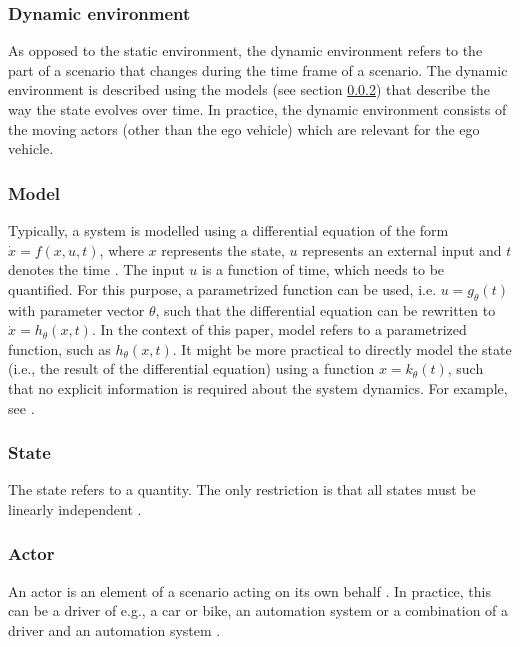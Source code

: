 \subsubsection{Dynamic environment}
\label{sec:dynamic environment}
As opposed to the static environment, the dynamic environment refers to the part of a scenario that changes during the time frame of a scenario. The dynamic environment is described using the models (see section \ref{sec:model}) that describe the way the state evolves over time. In practice, the dynamic environment consists of the moving actors (other than the ego vehicle) which are relevant for the ego vehicle.

\subsubsection{Model}
\label{sec:model}
Typically, a system is modelled using a differential equation of the form $\dot{x}=f(x,u,t)$, where $x$ represents the state, $u$ represents an external input and $t$ denotes the time \cite{norman2011control}. The input $u$ is a function of time, which needs to be quantified. For this purpose, a parametrized function can be used, i.e. $u=g_{\theta}(t)$ with parameter vector $\theta$, such that the differential equation can be rewritten to $\dot{x}=h_{\theta}(x,t)$. In the context of this paper, model refers to a parametrized function, such as $h_{\theta}(x,t)$. It might be more practical to directly model the state (i.e., the result of the differential equation) using a function $x=k_{\theta}(t)$, such that no explicit information is required about the system dynamics. For example, see \cite{deGelder2017assessment}.

\subsubsection{State}
\label{sec:state}
The state refers to a quantity. The only restriction is that all states must be linearly independent \cite{norman2011control}.

\subsubsection{Actor}
\label{sec:actor}
An actor is an element of a scenario acting on its own behalf \cite{ulbrich2015}. In practice, this can be a driver of e.g., a car or bike, an automation system or a combination of a driver and an automation system \cite{geyer2014}.
